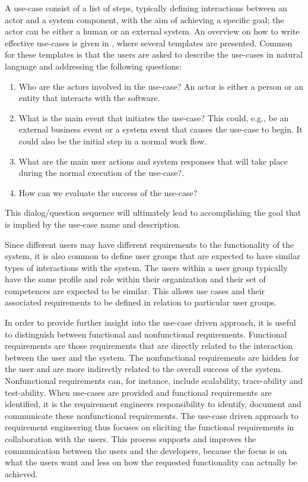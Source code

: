 A use-case consist of a list of steps, typically defining interactions between an actor and a system component, with the aim of
achieving a specific  goal; the actor can be either a human or an external system.  An overview on how to write
effective use-cases is given in \cite{Coc01}, where several templates are presented. Common for these templates is that
the users are asked to describe the use-cases in natural language and addressing the following questions:
\begin{enumerate}
\item Who are the actors involved in the use-case? An actor is either a person or an entity that interacts with the software.  
\item What is the main event that initiates the use-case? This could, e.g., be an external business event or a system event that causes the use-case to begin.  It could also be the initial step in a normal work flow. 
\item What are the main user actions and system responses that will take place during the normal execution of the use-case?. 
\item How can we evaluate the success of the use-case?
\end{enumerate}
This dialog/question sequence will ultimately lead to accomplishing the goal that is implied by the use-case name and description.

Since different users may have different requirements to the functionality of the system, it is also common to define
user groups that are expected to have similar types of interactions with the system. The users
within a user group typically have the same profile and role within their organization and their set of competences are expected to
be similar. This allows use cases and their associated requirements to be defined in relation to particular user groups.

In order to provide further insight into the use-case driven approach, it is useful to distinguish between functional and nonfunctional
requirements.  Functional requirements are those requirements that are directly related to the interaction between the
user and the system.  The nonfunctional requirements are hidden for the user and are more indirectly related to the  overall
success of the system.  Nonfunctional requirements can, for instance, include scalability, trace-ability and test-ability.  When use-cases are provided and functional
requirements are identified, it is the requirement engineers responsibility to identify, document and communicate these
nonfunctional requirements.  The use-case driven approach to requirement engineering thus focuses on eliciting the
functional requirements in collaboration with the users.  This process supports and improves the communication between the users and the developers,
because the focus is on what the users want and less on how the requested functionality can actually be achieved.
